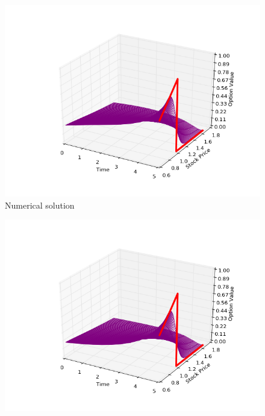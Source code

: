 \documentclass[11pt,a4paper]{extarticle}
\begin{document}
\begin{minipage}{\linewidth}
      \centering
      \begin{minipage}{0.29\linewidth}
          \begin{figure}[H]
              \includegraphics[width=\linewidth]{Figures/a-o-n-put-num}
              \caption{Numerical solution}
          \end{figure}
      \end{minipage}
      \hspace{0.04\linewidth}
      \begin{minipage}{0.29\linewidth}
          \begin{figure}[H]
              \includegraphics[width=\linewidth]{Figures/a-o-n-put-analyt}

\end{figure}
\end{minipage}
\end{minipage}
\end{document}
